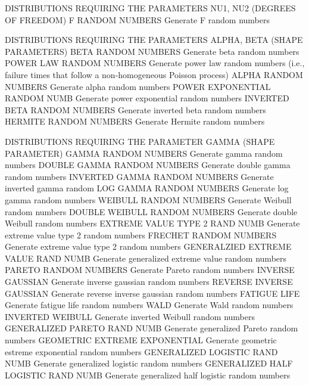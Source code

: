 DISTRIBUTIONS REQUIRING THE PARAMETERS NU1, NU2 (DEGREES OF FREEDOM)
   F RANDOM NUMBERS               Generate F random numbers

DISTRIBUTIONS REQUIRING THE PARAMETERS ALPHA, BETA (SHAPE PARAMETERS)
   BETA RANDOM NUMBERS            Generate beta random numbers
   POWER LAW RANDOM NUMBERS       Generate power law random numbers
                                  (i.e., failure times that follow a
                                  non-homogeneous Poisson process)
   ALPHA RANDOM NUMBERS           Generate alpha random numbers
   POWER EXPONENTIAL RANDOM NUMB  Generate power exponential random
                                  numbers
   INVERTED BETA RANDOM NUMBERS   Generate inverted beta random numbers
   HERMITE RANDOM NUMBERS         Generate Hermite random numbers
 
DISTRIBUTIONS REQUIRING THE PARAMETER GAMMA (SHAPE PARAMETER)
   GAMMA RANDOM NUMBERS           Generate gamma random numbers
   DOUBLE GAMMA RANDOM NUMBERS    Generate double gamma random numbers
   INVERTED GAMMA RANDOM NUMBERS  Generate inverted gamma random
   LOG GAMMA RANDOM NUMBERS       Generate log gamma random numbers
   WEIBULL RANDOM NUMBERS         Generate Weibull random numbers
   DOUBLE WEIBULL RANDOM NUMBERS  Generate double Weibull random
                                  numbers
   EXTREME VALUE TYPE 2 RAND NUMB Generate extreme value type 2 random
                                  numbers
   FRECHET RANDOM NUMBERS         Generate extreme value type 2 random
                                  numbers
   GENERALZIED EXTREME VALUE RAND NUMB Generate generalized extreme
                                       value random numbers
   PARETO RANDOM NUMBERS          Generate Pareto random numbers
   INVERSE GAUSSIAN               Generate inverse gaussian random
                                  numbers
   REVERSE INVERSE GAUSSIAN       Generate reverse inverse gaussian
                                  random numbers
   FATIGUE LIFE                   Generate fatigue life random numbers
   WALD                           Generate Wald random numbers
   INVERTED WEIBULL               Generate inverted Weibull random
                                  numbers
   GENERALIZED PARETO RAND NUMB   Generate generalized Pareto random
                                  numbers
   GEOMETRIC EXTREME EXPONENTIAL  Generate geometric estreme
                                  exponential random numbers
   GENERALIZED LOGISTIC RAND NUMB        Generate generalized logistic
                                         random numbers
   GENERALIZED HALF LOGISTIC RAND NUMB   Generate generalized half
                                         logistic random numbers
 
